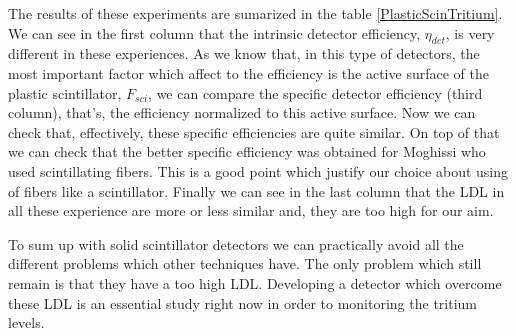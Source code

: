 
The results of these experiments are sumarized in the table \ref{PlasticScinTritium}. We can see in the first column that the intrinsic detector efficiency, $\eta_{det}$, is very different in these experiences. As we know that, in this type of detectors, the most important factor which affect to the efficiency is the active surface of the plastic scintillator, $F_{sci}$, we can compare the specific detector efficiency (third column), that's, the efficiency normalized to this active surface. Now we can check that, effectively, these specific efficiencies are quite similar. On top of that we can check that the better specific efficiency was obtained for Moghissi who used scintillating fibers. This is a good point which justify our choice about using of fibers like a scintillator. Finally we can see in the last column that the LDL in all these experience are more or less similar and, they are too high for our aim. 

To sum up with solid scintillator detectors we can practically avoid all the different problems which other techniques have. The only problem which still remain is that they have a too high LDL. Developing a detector which overcome these LDL is an essential study right now in order to monitoring the tritium levels.